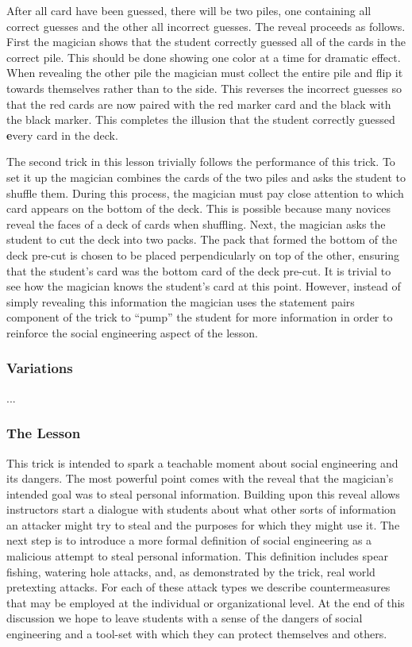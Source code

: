 After all card have been guessed, there will be two piles,
one containing all correct guesses and the other
all incorrect guesses.
The reveal proceeds as follows.
First the magician shows that the student correctly guessed all of the cards
in the correct pile.  This should be done showing one color at a time for
dramatic effect.  When revealing the other pile the magician must collect the
entire pile and flip it towards themselves rather than to the side.  This
reverses the incorrect guesses so that the red cards are now paired
with the red marker card and the black with the black marker.  This completes
the illusion that the student correctly guessed {\textbf every} card in the
deck.

The second trick in this lesson trivially follows the performance of this trick.
To set it up the magician combines the cards of the two piles and asks the
student to shuffle them.  During this process, the magician must pay close
attention to which card appears on the bottom of the deck.  This is possible
because many novices reveal the faces of a deck of cards when shuffling.  Next,
the magician asks the student to cut the deck into two packs.  The pack that
formed the bottom of the deck pre-cut is chosen to be placed perpendicularly on
top of the other, ensuring that the student's card was the bottom card of
the deck pre-cut.  It is trivial to see how the magician knows the student's
card at this point.  However, instead of simply revealing this information the
magician uses the statement pairs component of the trick to ``pump'' the student
for more information in order to reinforce the social engineering aspect of the
lesson.

\subsubsection{Variations}

...

\subsubsection{The Lesson}

This trick is intended to spark a teachable moment about social engineering and
its dangers.  The most powerful point comes with the reveal that the magician's
intended goal was to steal personal information.
Building upon this reveal allows instructors start a dialogue with
students about what other
sorts of information an attacker might try to steal and the purposes for which
they might use it.
The next step is to introduce a more formal definition of social engineering as
a malicious attempt to steal personal information.  This definition includes
spear fishing, watering hole attacks, and, as demonstrated by the trick, real
world pretexting attacks.
For each of these attack types we describe countermeasures that may be employed
at the individual or organizational level.
At the end of this discussion we hope to leave students with a sense of the
dangers of social engineering and a tool-set with which they can protect
themselves and others.

